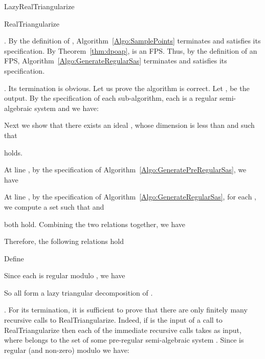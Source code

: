 \documentclass{sig-alternate}
\def\S {\ensuremath{\mathfrak{S}}}
\newcommand{\RealTriangularize}[1]{\mbox{{\sf RealTriangularize}}}
\newcommand{\LazyRealTriangularize}[1]{\mbox{{\sf LazyRealTriangularize}}}
\begin{document}
\begin{algorithm}
\dontprintsemicolon
\linesnumbered
\caption{\LazyRealTriangularize{\S}\label{Algo:LazyRealTriangularize}}
\;
\end{algorithm}


\begin{algorithm}
\dontprintsemicolon
\linesnumbered
\caption{\RealTriangularize{\S}\label{Algo:RealTriangularize}}
\;
\end{algorithm}



\smallskip{}.
By the definition of , 
Algorithm~\ref{Algo:SamplePoints} terminates and satisfies its specification.
By Theorem~\ref{thm:dpoap}, 
 is an {\small FPS}.
Thus, by the definition of an {\small FPS},
Algorithm~\ref{Algo:GenerateRegularSas}
terminates and satisfies its specification.

\smallskip{}.
Its termination is obvious.
Let us prove the algorithm is correct.
Let ,  be the output. 
By the specification of each sub-algorithm, 
each  is a regular semi-algebraic system and we have:

Next we show that 
there exists an ideal ,
whose dimension is less than 
and 
such that 

holds.

At line , 
by the specification of Algorithm~\ref{Algo:GeneratePreRegularSas}, 
we have

At line , 
by the specification of Algorithm~\ref{Algo:GenerateRegularSas},
for each , we compute a set  such that 
and 

both hold.
Combining the two relations together, we have

Therefore, the following relations hold

Define 

Since each  is regular modulo , 
we have

So all  form a lazy triangular decomposition of .



\smallskip{}.
For its termination, it is sufficient to prove that
there are only finitely many recursive calls to {\sf RealTriangularize}. 
Indeed, if  is the input of a call to {\sf RealTriangularize}
then each of the immediate recursive calls takes 
as input, where  belongs to the 
set  of some pre-regular semi-algebraic system .
Since  is regular (and non-zero) modulo  we have:
\end{document}
